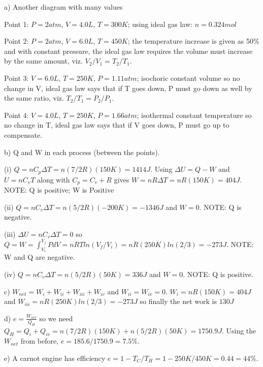 \documentclass[10pt]{article}
\newenvironment{problem}[2][Problem]{\begin{trivlist}
\item[\hskip \labelsep {\bfseries #1}\hskip \labelsep {\bfseries #2.}]}{\end{trivlist}}
\begin{document}
\begin{problem}{4}
\item a) Another diagram with many values
\item Point 1: $P = 2atm$, $V=4.0L$, $T=300K$; using ideal gas law: $n=0.324mol$
\item Point 2: $P = 2atm$, $V=6.0L$, $T=450K$; the temperature increase is given as 50\% and with constant pressure, the ideal gas law requires the volume must increase by the same amount, viz. $V_2/V_1=T_2/T_1$.
\item Point 3: $V=6.0L$, $T=250K$, $P=1.11atm$; isochoric constant volume so no change in V, ideal gas law says that if T goes down, P must go down as well by the same ratio, viz. $T_2/T_1 = P_2/P_1$.
\item Point 4: $V=4.0L$, $T=250K$, $P=1.66atm$; isothermal constant temperature  so no change in T, ideal gas law says that if V goes down, P must go up to compensate.

\item b) Q and W in each process (between the points).
\item (i) $Q=nC_p\Delta T=n(7/2 R)(150K)=1414J$. Using $\Delta U = Q - W$ and $U=nC_vT$ along with $C_p = C_v + R$ gives $W=nR\Delta T=nR(150K)=404J$. NOTE: Q is positive; W is Positive
\item (ii) $Q=nC_v\Delta T=n(5/2R)(-200K)=-1346J$ and $W=0$. NOTE: Q is negative.
\item (iii) $\Delta U = nC_v\Delta T = 0$ so $Q=W=\int_{V_i}^{V_f}PdV=nRTln(V_f/V_i)=nR(250K)ln(2/3)=-273J$. NOTE: W and Q are negative.
\item (iv) $Q=nC_v\Delta T=n(5/2R)(50K)=336J$ and $W=0$. NOTE: Q is positive.

\item c) $W_{net} = W_i + W_{ii} + W_{iii} + W_{iv}$ and $W_{ii}=W_{iv}=0$. $W_i=nR(150K)=404J$ and $W_{iii}=nR(250K)ln(2/3)=-273J$ so finally the net work is $130J$
\item d) $e = \frac{W_{net}}{Q_H}$ so we need $Q_H=Q_i + Q_{iv}= n(7/2 R)(150K)+n(5/2R)(50K)=1750.9J$. Using the $W_{net}$ from before, $e=185.6/1750.9=7.5\%$.
\item e) A carnot engine has efficiency $e=1-T_C/T_H=1-250K/450K=0.44=44\%$.

\end{problem}
\end{document}
